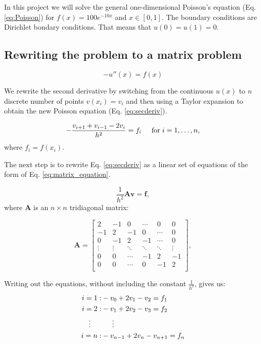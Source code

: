 In this project we will solve the general one-dimensional Poisson's equation (Eq. \ref{eq:Poisson}) for $f(x) = 100e^{-10x}$ and $x \in [0,1]$. The boundary conditions are Dirichlet bondary conditions. That means that $u(0) = u(1) = 0$.

\subsection{Rewriting the problem to a matrix problem}

\begin{equation}\label{eq:Poisson}
-u''(x) = f(x)
\end{equation}

We rewrite the second derivative by switching from the continuous $u(x)$ to $n$ discrete number of points $v(x_i) = v_i$ and then using a Taylor expansion to obtain the new Poisson equation (Eq. \ref{eq:secderiv}).

\begin{equation}\label{eq:secderiv}
-\frac{v_{i+1}+v_{i-1}-2v_i}{h^2} = f_i  \hspace{0.5cm} \mathrm{for} \hspace{0.1cm} i=1,\dots, n,
\end{equation}
where $f_i=f(x_i)$.

The next step is to rewrite Eq. \ref{eq:secderiv} as a linear set of equations of the form of Eq. \ref{eq:matrix_equation}.

\begin{equation}\label{eq:matrix_equation}
   \frac{1}{h^2}\mathbf{A}\mathbf{v} = \mathbf{f},
\end{equation}
where $\mathbf{A}$ is an $n\times n$  tridiagonal matrix:

\[
    \mathbf{A} = \begin{bmatrix}
    	2& -1& 0 &\cdots & 0 &0 \\
        -1 & 2 & -1 &0 &\cdots &0 \\
        0&-1 &2 & -1 & \cdots & 0 \\
        \vdots& \vdots & \ddots &\ddots &\ddots & \vdots \\
        0&0 & \cdots &-1 &2& -1 \\
        0&0 & \cdots & 0  &-1 & 2 \\
        \end{bmatrix},
\]

Writing out the equations, without including the constant $\frac{1}{h^2}$, gives us:
\begin{align*}
i = 1: &-v_0+2v_1-v_2 = f_1\\
i = 2: &-v_1+2v_2-v_3 = f_2\\
\vdots \indent &\indent \vdots\\
i = n: &-v_{n-1}+2v_n-v_{n+1} = f_n\\
\end{align*}

